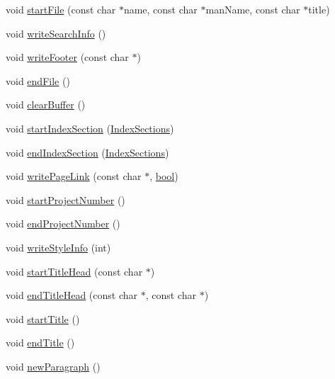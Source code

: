 \begin{DoxyCompactItemize}
\item 
void \hyperlink{class_man_generator_a694e4eb58c60cf927b2dc0b764756274}{start\+File} (const char $\ast$name, const char $\ast$man\+Name, const char $\ast$title)
\item 
void \hyperlink{class_man_generator_a96fbf7763c494b5d68e80e8c66517e30}{write\+Search\+Info} ()
\item 
void \hyperlink{class_man_generator_a1b05b289f0788338aa5c6cbafcbc1264}{write\+Footer} (const char $\ast$)
\item 
void \hyperlink{class_man_generator_a15c31d2c71f0155387f7a94586e867ee}{end\+File} ()
\item 
void \hyperlink{class_man_generator_ac9637931a3179354ab9757536c6f87dd}{clear\+Buffer} ()
\item 
void \hyperlink{class_man_generator_a16139edbbc00e57e3b17c803b36dff22}{start\+Index\+Section} (\hyperlink{index_8h_aec03800047ada46460eb75113cfee322}{Index\+Sections})
\item 
void \hyperlink{class_man_generator_aa098d1eeb8758aa1b4626380c3848395}{end\+Index\+Section} (\hyperlink{index_8h_aec03800047ada46460eb75113cfee322}{Index\+Sections})
\item 
void \hyperlink{class_man_generator_a526966444ebff24c3afc9129280a0636}{write\+Page\+Link} (const char $\ast$, \hyperlink{qglobal_8h_a1062901a7428fdd9c7f180f5e01ea056}{bool})
\item 
void \hyperlink{class_man_generator_a9e8739b09bd5788c0b44711d9bbe1fbb}{start\+Project\+Number} ()
\item 
void \hyperlink{class_man_generator_ab9165a61b79e3e2f6bb7a6be7fb3b592}{end\+Project\+Number} ()
\item 
void \hyperlink{class_man_generator_a9d0f82f72d8efcf0aec1b73010cb5399}{write\+Style\+Info} (int)
\item 
void \hyperlink{class_man_generator_ab7edd0149d49b267b295f7e45f05c1b3}{start\+Title\+Head} (const char $\ast$)
\item 
void \hyperlink{class_man_generator_a3bf5507570176973698d86176b3ecb08}{end\+Title\+Head} (const char $\ast$, const char $\ast$)
\item 
void \hyperlink{class_man_generator_ae53c0d4f7905f85069f2e253f97f99a6}{start\+Title} ()
\item 
void \hyperlink{class_man_generator_a5f10174e0eec5ab53365aad27ad48f22}{end\+Title} ()
\item 
void \hyperlink{class_man_generator_a0242c97cf62889e69e74196b9567e7d0}{new\+Paragraph} ()
\item 

\end{DoxyCompactItemize}
